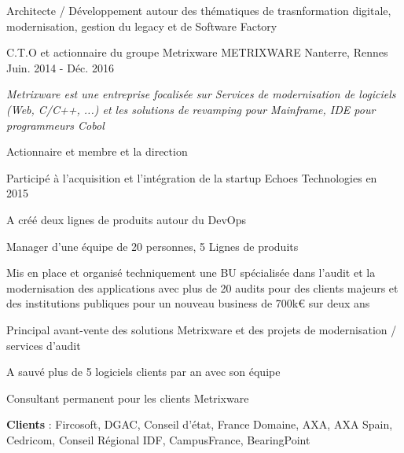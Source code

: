 \begin{cventries}
{\begin{cvitems}
		\item {Architecte / Développement autour des thématiques de trasnformation digitale, modernisation, gestion du legacy et de Software Factory}
	\end{cvitems}
}
  \cventry
    {C.T.O et actionnaire du groupe Metrixware} %
    {METRIXWARE} %
    {Nanterre, Rennes} %
    {Juin. 2014 - Déc. 2016} %
    {
      \begin{cvitems} %
        \item {\textit{Metrixware est une entreprise focalisée sur Services de modernisation de logiciels (Web, C/C++, ...) et les solutions de revamping pour Mainframe, IDE pour programmeurs Cobol}}
        \item {Actionnaire et membre et la direction}
        \item {Participé à l'acquisition et l'intégration de la startup Echoes Technologies en 2015}
        \item {A créé deux lignes de produits autour du DevOps}
        \item {Manager d'une équipe de 20 personnes, 5 Lignes de produits}
        \item {Mis en place et organisé techniquement une BU spécialisée dans l'audit et la modernisation des applications avec plus de 20 audits pour des clients majeurs et des institutions publiques pour un nouveau business de 700k€ sur deux ans}
        \item {Principal avant-vente des solutions Metrixware et des projets de modernisation / services d'audit}
        \item {A sauvé plus de 5 logiciels clients par an avec son équipe}
        \item {Consultant permanent pour les clients Metrixware}
        \item {\textbf{Clients} : Fircosoft, DGAC, Conseil d'état, France Domaine, AXA, AXA Spain, Cedricom, Conseil Régional IDF, CampusFrance, BearingPoint}
      \end{cvitems}
    }


\end{cventries}
